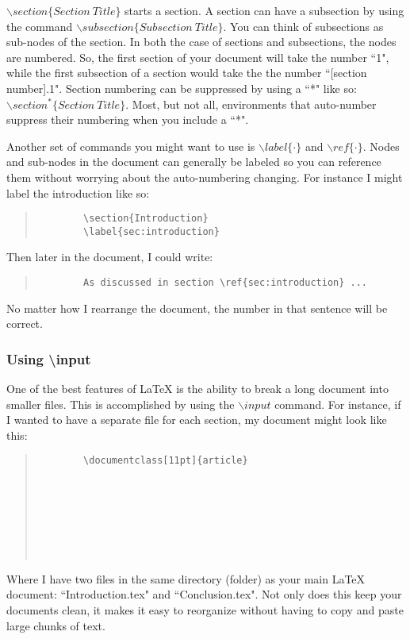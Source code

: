 $\backslash section\{Section~Title\}$ starts a section.  A section can have a subsection by using the command $\backslash subsection\{Subsection~Title\}$.  You can think of subsections as sub-nodes of the section.  In both the case of sections and subsections, the nodes are numbered.  So, the first section of your document will take the number ``1", while the first subsection of a section would take the the number ``[section number].1".  Section numbering can be suppressed by using a ``*" like so: $\backslash section^*\{Section~Title\}$.  Most, but not all, environments that auto-number suppress their numbering when you include a ``*".

Another set of commands you might want to use is $\backslash label\{\cdot\}$ and $\backslash ref\{\cdot\}$.  Nodes and sub-nodes in the document can generally be labeled so you can reference them without worrying about the auto-numbering changing.  For instance I might label the introduction like so:

\begin{quote}
	\begin{verbatim}
		\section{Introduction}
		\label{sec:introduction} 
	\end{verbatim}
\end{quote}

Then later in the document, I could write:

\begin{quote}
	\begin{verbatim}
		As discussed in section \ref{sec:introduction} ...
	\end{verbatim}
\end{quote}

No matter how I rearrange the document, the number in that sentence will be correct.

\subsubsection{Using \textbackslash input}

One of the best features of LaTeX is the ability to break a long document into smaller files.  This is accomplished by using the $\backslash input$ command.  For instance, if I wanted to have a separate file for each section, my document might look like this:

\begin{quote}
	\begin{verbatim}
		\documentclass[11pt]{article}
		
		 
		
		
		
			
		
	\end{verbatim}
\end{quote}

Where I have two files in the same  directory (folder) as your main LaTeX document: ``Introduction.tex" and ``Conclusion.tex".  Not only does this keep your documents clean, it makes it easy to reorganize without having to copy and paste large chunks of text.